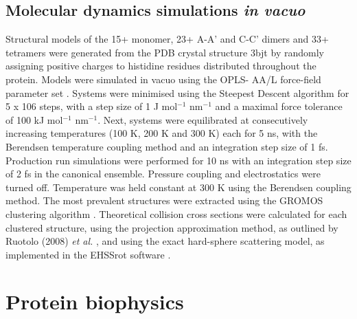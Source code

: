 \subsection{Molecular dynamics simulations \textit{in vacuo}}
\label{methods:vacuo_md}
Structural models of the 15+ monomer, 23+ A-A' and C-C' dimers and 33+ tetramers were generated from the PDB crystal structure 3bjt \cite{Christofk:2008aa} by randomly assigning positive charges to histidine residues distributed throughout the protein. Models were simulated in vacuo using the OPLS- AA/L force-field parameter set \cite{Robertson:2015aa}. Systems were minimised using the Steepest Descent algorithm for 5 x 106 steps, with a step size of 1 J mol$^{-1}$ nm$^{-1}$ and a maximal force tolerance of 100 kJ mol$^{-1}$ nm$^{-1}$. Next, systems were equilibrated at consecutively increasing temperatures (100 K, 200 K and 300 K) each for 5 ns, with the Berendsen temperature coupling method and an integration step size of 1 fs. Production run simulations were performed for 10 ns with an integration step size of 2 fs in the canonical ensemble. Pressure coupling and electrostatics were turned off. Temperature was held constant at 300 K using the Berendsen coupling method. The most prevalent structures were extracted using the GROMOS clustering algorithm \cite{Daura:2001aa}. Theoretical collision cross sections were calculated for each clustered structure, using the projection approximation method, as outlined by Ruotolo (2008) \textit{et al.} \cite{Ruotolo:2008aa}, and using the exact hard-sphere scattering model, as implemented in the EHSSrot software \cite{Shvartsburg:2007aa}.

\clearpage

\section{Protein biophysics}

